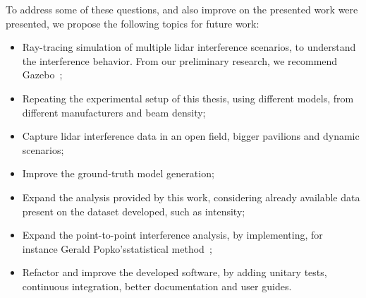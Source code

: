To address some of these questions, and also improve on the presented work were presented, we propose the following topics for future work:

\begin{itemize}
	\item Ray-tracing simulation of multiple \ac{lidar} interference scenarios, to understand the interference behavior. From our preliminary research, we recommend Gazebo\cp~\cite{Gazebo};
	\item Repeating the experimental setup of this thesis, using different models, from different manufacturers and beam density;
	\item Capture \ac{lidar} interference data in an open field, bigger pavilions and dynamic scenarios;
	\item Improve the ground-truth model generation;
	\item Expand the analysis provided by this work, considering already available data present on the dataset developed, such as intensity;
	\item Expand the point-to-point interference analysis, by implementing, for instance Gerald Popko's\etal statistical method~\cite{Popko2019b};
	\item Refactor and improve the developed software, by adding unitary tests, continuous integration, better documentation and user guides.
\end{itemize}



